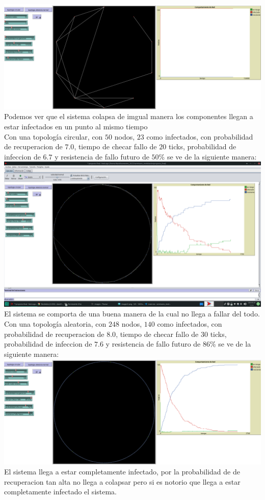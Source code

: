 \documentclass[12pt]{article}
\begin{document}
\textbf{\includegraphics[scale = 0.28]{images/images6.png}} Podemos ver que el sistema colapsa de imgual manera los componentes llegan a estar infectados en un punto al mismo tiempo\\

Con una topología circular, con $50$ nodos, $23$ como infectados, con probabilidad de recuperacion de $7.0$, tiempo de checar fallo de $20$ ticks, probabilidad de infeccion de $6.7$ y resistencia de fallo futuro de $50$\% se ve de la siguiente manera:\\

\textbf{\includegraphics[scale = 0.28]{images/images7.png}} El sistema se comporta de una buena manera de la cual no llega a fallar del todo.\\

Con una topología aleatoria, con $248$ nodos, $140$ como infectados, con probabilidad de recuperacion de $8.0$, tiempo de checar fallo de $30$ ticks, probabilidad de infeccion de $7.6$ y resistencia de fallo futuro de $86$\% se ve de la siguiente manera:\\

\textbf{\includegraphics[scale = 0.28]{images/images8.png}} El sistema llega a estar completamente infectado, por la probabilidad de de recuperacion tan alta no llega a colapsar pero si es notorio que llega a estar completamente infectado el sistema.\\
\end{document}
